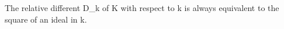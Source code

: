 The relative different D_k of K with respect to k is always equivalent to the square of an ideal in k.
